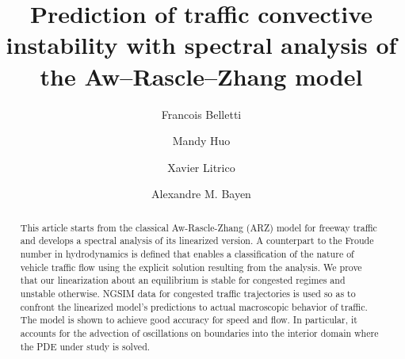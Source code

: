 \documentclass[5p,twocolumn]{elsarticle}
\begin{document}
\begin{frontmatter}
\title{Prediction of traffic convective instability with spectral analysis of the Aw--Rascle--Zhang model}

\author[EECSAddress]{Francois Belletti}

\author[PhyAddress,MathAddress]{Mandy Huo}

\author[LitricoAddress]{Xavier Litrico}

\author[EECSAddress,CEAddress,ITSAddress]{Alexandre M. Bayen}

\address[EECSAddress]{
Department of Electrical Engineering and Computer Sciences,
University of California, Berkeley,
United States
}

\address[PhyAddress]{
Department of Physics,
University of California, Berkeley,
United States
}

\address[MathAddress]{
Department of Mathematics,
University of California, Berkeley,
United States
}

\address[CEAddress]{
Department of Civil and Environmental Engineering,
University of California, Berkeley,
United States
}

\address[ITSAddress]{
Institute of Transportation Studies
University of California, Berkeley,
United States
}

\address[LitricoAddress]{
LyRE, R\&D center of Lyonnaise des Eaux
91, rue Paulin, 33029 Bordeaux cedex, France
}

%
%
%

\begin{abstract}
This article starts from the classical Aw-Rascle-Zhang (ARZ) model for freeway traffic and develops a spectral analysis of its linearized version. A counterpart to the Froude number in hydrodynamics is defined that enables a classification of the nature of vehicle traffic flow using the explicit solution resulting from the analysis. We prove that our linearization about an equilibrium is stable for congested regimes and unstable otherwise. NGSIM data for congested traffic trajectories is used so as to confront the linearized model's predictions to actual macroscopic behavior of traffic. The model is shown to achieve good accuracy for speed and flow. In particular, it accounts for the advection of oscillations on boundaries into the interior domain where the PDE under study is solved.
\end{abstract}


\end{frontmatter}
\end{document}
